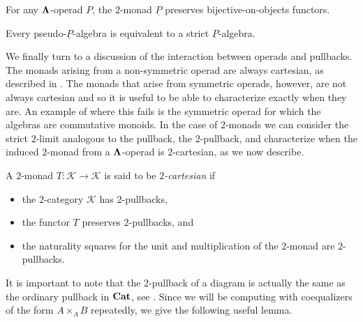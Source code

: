 \begin{prop}
For any $\mathbf{\Lambda}$-operad $P$, the $2$-monad $\underline{P}$ preserves bijective-on-objects functors.
\end{prop}
\begin{cor}
Every pseudo-$\underline{P}$-algebra is equivalent to a strict $\underline{P}$-algebra.
\end{cor}



We finally turn to a discussion of the interaction between operads and pullbacks. The monads arising from a non-symmetric operad are always cartesian, as described in \cite{leinster}. The monads that arise from symmetric operads, however, are not always cartesian and so it is useful to be able to characterize exactly when they are. An example of where this fails is the symmetric operad for which the algebras are commutative monoids. In the case of $2$-monads we can consider the  strict $2$-limit analogous to the pullback, the $2$-pullback, and characterize when the induced $2$-monad from a $\mathbf{\Lambda}$-operad is $2$-cartesian, as we now describe.

\begin{Defi}
A $2$-monad $T \colon \mathcal{K} \rightarrow \mathcal{K}$ is said to be \textit{$2$-cartesian} if
    \begin{itemize}
        \item the $2$-category $\mathcal{K}$ has $2$-pullbacks,
        \item the functor $T$ preserves $2$-pullbacks, and
        \item the naturality squares for the unit and multiplication of the $2$-monad are $2$-pullbacks.
    \end{itemize}
\end{Defi}

It is important to note that the  $2$-pullback of a diagram is actually the same as the ordinary pullback in $\mathbf{Cat}$, see \cite{kelly-elem}. Since we will be computing with coequalizers of the form $A \times_{\Lambda} B$ repeatedly, we give the following useful lemma.


